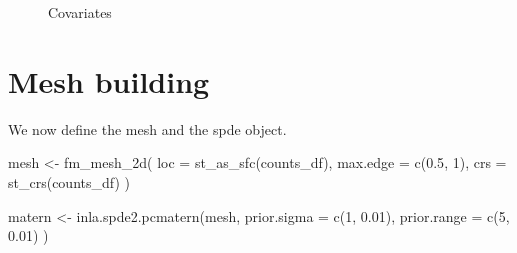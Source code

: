 \documentclass[
  letterpaper,
  DIV=11,
  numbers=noendperiod]{scrartcl}
\newenvironment{Shaded}{\begin{snugshade}}{\end{snugshade}}
\newcommand{\AttributeTok}[1]{\textcolor[rgb]{0.40,0.45,0.13}{#1}}
\newcommand{\DecValTok}[1]{\textcolor[rgb]{0.68,0.00,0.00}{#1}}
\newcommand{\FloatTok}[1]{\textcolor[rgb]{0.68,0.00,0.00}{#1}}
\newcommand{\FunctionTok}[1]{\textcolor[rgb]{0.28,0.35,0.67}{#1}}
\newcommand{\NormalTok}[1]{\textcolor[rgb]{0.00,0.23,0.31}{#1}}
\newcommand{\OtherTok}[1]{\textcolor[rgb]{0.00,0.23,0.31}{#1}}
\begin{document}
\begin{figure}


\caption{\label{fig-covariate-raster}Covariates}

\end{figure}%

\section{Mesh building}\label{mesh-building}

We now define the mesh and the spde object.

\begin{Shaded}
\begin{Highlighting}[]

\NormalTok{mesh }\OtherTok{\textless{}{-}} \FunctionTok{fm\_mesh\_2d}\NormalTok{(}
  \AttributeTok{loc =} \FunctionTok{st\_as\_sfc}\NormalTok{(counts\_df),}
  \AttributeTok{max.edge =} \FunctionTok{c}\NormalTok{(}\FloatTok{0.5}\NormalTok{, }\DecValTok{1}\NormalTok{),}
  \AttributeTok{crs =} \FunctionTok{st\_crs}\NormalTok{(counts\_df)}
\NormalTok{)}

\NormalTok{matern }\OtherTok{\textless{}{-}} \FunctionTok{inla.spde2.pcmatern}\NormalTok{(mesh,}
  \AttributeTok{prior.sigma =} \FunctionTok{c}\NormalTok{(}\DecValTok{1}\NormalTok{, }\FloatTok{0.01}\NormalTok{),}
  \AttributeTok{prior.range =} \FunctionTok{c}\NormalTok{(}\DecValTok{5}\NormalTok{, }\FloatTok{0.01}\NormalTok{)}
\NormalTok{)}
\end{Highlighting}
\end{Shaded}
\end{document}
